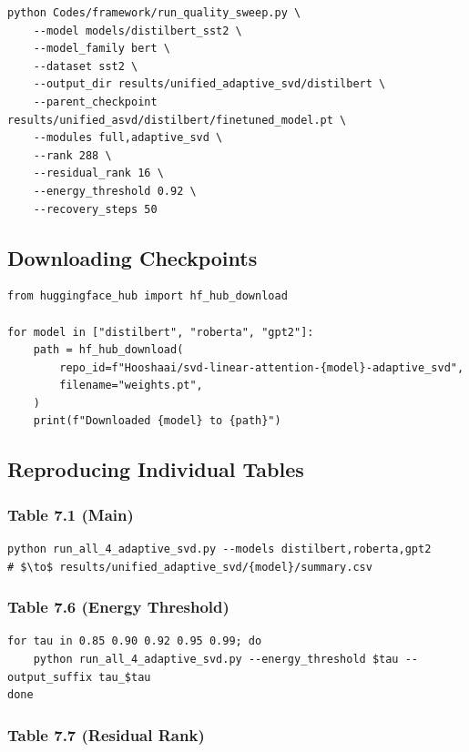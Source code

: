 \begin{lstlisting}
python Codes/framework/run_quality_sweep.py \
    --model models/distilbert_sst2 \
    --model_family bert \
    --dataset sst2 \
    --output_dir results/unified_adaptive_svd/distilbert \
    --parent_checkpoint results/unified_asvd/distilbert/finetuned_model.pt \
    --modules full,adaptive_svd \
    --rank 288 \
    --residual_rank 16 \
    --energy_threshold 0.92 \
    --recovery_steps 50
\end{lstlisting}

\subsection{Downloading Checkpoints}

\begin{lstlisting}
from huggingface_hub import hf_hub_download

for model in ["distilbert", "roberta", "gpt2"]:
    path = hf_hub_download(
        repo_id=f"Hooshaai/svd-linear-attention-{model}-adaptive_svd",
        filename="weights.pt",
    )
    print(f"Downloaded {model} to {path}")
\end{lstlisting}

\subsection{Reproducing Individual Tables}

\subsubsection{Table 7.1 (Main)}

\begin{lstlisting}
python run_all_4_adaptive_svd.py --models distilbert,roberta,gpt2
# $\to$ results/unified_adaptive_svd/{model}/summary.csv
\end{lstlisting}

\subsubsection{Table 7.6 (Energy Threshold)}

\begin{lstlisting}
for tau in 0.85 0.90 0.92 0.95 0.99; do
    python run_all_4_adaptive_svd.py --energy_threshold $tau --output_suffix tau_$tau
done
\end{lstlisting}

\subsubsection{Table 7.7 (Residual Rank)}

